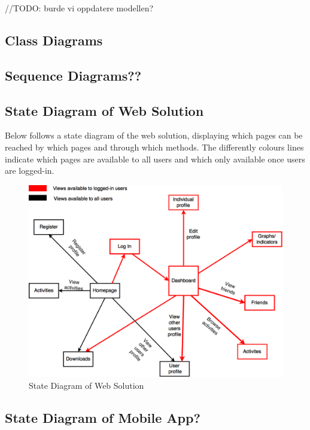 //TODO: burde vi oppdatere modellen?
\subsection{Class Diagrams}
\subsection{Sequence Diagrams??}
\subsection{State Diagram of Web Solution}
Below follows a state diagram of the web solution, displaying which pages can be reached by which pages and through which methods. The differently colours lines indicate which pages are available to all users and which only available once users are logged-in. 
\begin{figure}[H]
\centering
\includegraphics[scale=0.4]{Figures/StateDiagram.png}
\caption{State Diagram of Web Solution}
\label{fig:WebState}
\end{figure}


\subsection{State Diagram of Mobile App?}
